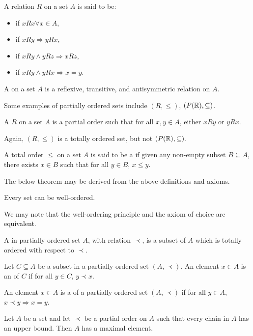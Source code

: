 \begin{definition}
    A relation $R$ on a set $A$ is said to be:
    \begin{itemize}
        \item {} if $xRx \forall x \in A$,
        \item {} if $xRy \Rightarrow yRx$,
        \item {} if $xRy \wedge yRz \Rightarrow xRz$,
        \item {} if $xRy \wedge yRx \Rightarrow x = y$.
    \end{itemize}
\end{definition}

\begin{definition}
    A  on a set $A$ is a reflexive, transitive, and antisymmetric relation on $A$.
\end{definition}
Some examples of partially ordered sets include $(R, \leq)$, $(P(\mathbb{R}), \subseteq)$.

\begin{definition}
    A  $R$ on a set $A$ is a partial order such that for all $x,y \in A$, either $xRy$ or $yRx$.
\end{definition}
Again, $(R, \leq)$ is a totally ordered set, but not $(P(\mathbb{R}), \subseteq)$.
\begin{definition}
    A total order $\leq$ on a set $A$ is said to be a  if given any non-empty subset $B \subseteq A$, there exists $x \in B$ such that for all $y \in B$, $x \leq y$.
\end{definition}

The below theorem may be derived from the above definitions and axioms.

\begin{theorem}
    Every set can be well-ordered.
\end{theorem}
We may note that the well-ordering principle and the axiom of choice are equivalent.

\begin{definition}
    A  in partially ordered set $A$, with relation $\prec$, is a subset of $A$ which is totally ordered with respect to $\prec$.
\end{definition}
\begin{definition}
    Let $C \subseteq A$ be a subset in a partially ordered set $(A, \prec)$. An element $x \in A$ is an  of $C$ if for all $y \in C$, $y \prec x$.
\end{definition}
\begin{definition}
    An element $x \in A$ is a  of a partially ordered set $(A, \prec)$ if for all $y \in A$, $x \prec y \Rightarrow x = y$.
\end{definition}
\begin{lemma}
    Let $A$ be a set and let $\prec$ be a partial order on $A$ such that every chain in $A$ has an upper bound. Then $A$ has a maximal element.
\end{lemma}


